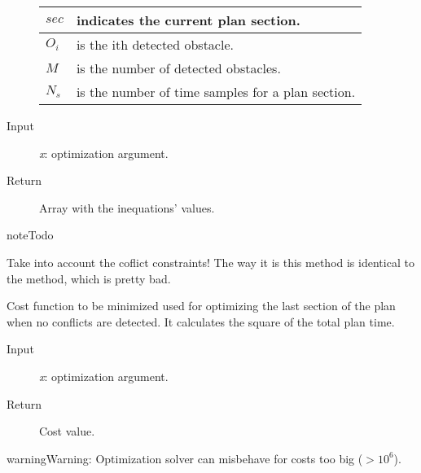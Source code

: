 \documentclass[letterpaper,10pt,english]{sphinxmanual}
\begin{document}
\begin{fulllineitems}
\begin{fulllineitems}
\begin{description}
\begin{tabulary}{\linewidth}{|L|L|}
\(sec\)
 & 
indicates the current plan section.
\\
\hline
\(O_i\)
 & 
is the ith detected obstacle.
\\
\hline
\(M\)
 & 
is the number of detected obstacles.
\\
\hline
\(N_s\)
 & 
is the number of time samples for a plan section.
\\
\hline\end{tabulary}


\item[{Input}] \leavevmode
\emph{x}: optimization argument.

\item[{Return}] \leavevmode
Array with the inequations' values.

\end{description}

\begin{notice}{note}{Todo}

Take into account the coflict constraints!
The way it is this method is identical to the {\hyperref[Multi-robot motion planner:planning_sim.Robot._ls_sa_fieqcons]{}} method,
which is pretty bad.
\end{notice}

\end{fulllineitems}


\begin{fulllineitems}
\label{Multi-robot motion planner:planning_sim.Robot._ls_sa_criterion}
Cost function to be minimized used for optimizing
the last section of the plan when no conflicts are detected.
It calculates the square of the total plan time.
\begin{description}
\item[{Input}] \leavevmode
\emph{x}: optimization argument.

\item[{Return}] \leavevmode
Cost value.

\end{description}

\begin{notice}{warning}{Warning:}
Optimization solver can misbehave for costs too big (\(> 10^{6}\)).
\end{notice}

\end{fulllineitems}


\end{fulllineitems}
\end{document}
